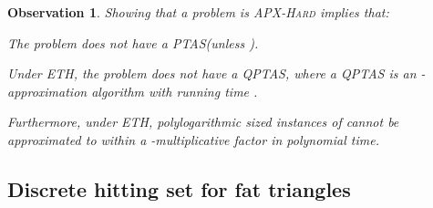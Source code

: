 \documentclass[12pt]{article}
\newcommand{\Term}[1]{\textsf{#1}}
\newtheorem{observation}[theorem]{Observation}
\theoremstyle{remark}\theoremheaderfont{\sf}\theorembodyfont{\upshape}
\numberwithin{figure}{section}\numberwithin{table}{section}\numberwithin{equation}{section}
\newcommand{\ETH}{\Term{ETH}\xspace}
\providecommand{\ComplexityClass}[1]{{{\textcolor[named]{ColorComplexityClass}{\textsc{#1}}}}}
\newcommand{\PTAS}{\Term{PTAS}\xspace}
\newcommand{\QPTAS}{\Term{QPTAS}\xspace}
\newcommand{\APXHard}{\ComplexityClass{APX-Hard}\xspace}
\begin{document}
\begin{observation}
  Showing that a problem  is \APXHard implies that:
  \begin{compactenum}[(A)]
  \item The problem  does not have a \PTAS (unless ).

  \item Under \ETH, the problem  does not have a \QPTAS, where a
    \QPTAS is an -approximation algorithm with running time
    .

  \item Furthermore, under \ETH, polylogarithmic sized instances of
     cannot be approximated to within a -multiplicative
    factor in polynomial time.
  \end{compactenum}
\end{observation}


\subsection{Discrete hitting set for fat triangles}
\end{document}
